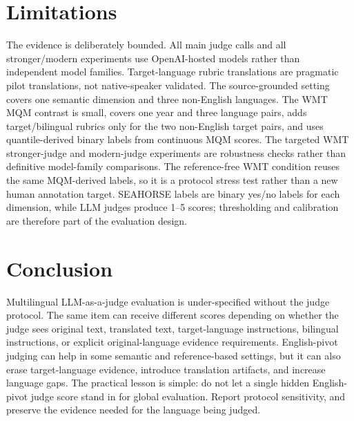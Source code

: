 \documentclass{article}
\begin{document}
\section{Limitations}

The evidence is deliberately bounded. All main judge calls and all stronger/modern experiments use OpenAI-hosted models rather than independent model families. Target-language rubric translations are pragmatic pilot translations, not native-speaker validated. The source-grounded setting covers one semantic dimension and three non-English languages. The WMT MQM contrast is small, covers one year and three language pairs, adds target/bilingual rubrics only for the two non-English target pairs, and uses quantile-derived binary labels from continuous MQM scores. The targeted WMT stronger-judge and modern-judge experiments are robustness checks rather than definitive model-family comparisons. The reference-free WMT condition reuses the same MQM-derived labels, so it is a protocol stress test rather than a new human annotation target. SEAHORSE labels are binary yes/no labels for each dimension, while LLM judges produce 1--5 scores; thresholding and calibration are therefore part of the evaluation design.

\section{Conclusion}

Multilingual LLM-as-a-judge evaluation is under-specified without the judge protocol. The same item can receive different scores depending on whether the judge sees original text, translated text, target-language instructions, bilingual instructions, or explicit original-language evidence requirements. English-pivot judging can help in some semantic and reference-based settings, but it can also erase target-language evidence, introduce translation artifacts, and increase language gaps. The practical lesson is simple: do not let a single hidden English-pivot judge score stand in for global evaluation. Report protocol sensitivity, and preserve the evidence needed for the language being judged.

\begingroup
\small
\setlength{\bibsep}{2pt}


\endgroup
\end{document}
